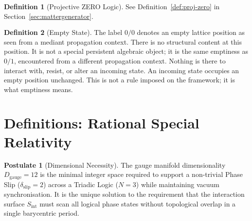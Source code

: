 \documentclass[11pt, letterpaper]{article}
\newcommand{\Dg}{D_{\mathrm{gauge}}}
\newcommand{\Sint}{S_{\mathrm{int}}}
\theoremstyle{definition}
\newtheorem{definition}{Definition}[section]
\newtheorem{postulate}{Postulate}[section]
\theoremstyle{plain}
\begin{document}
\begin{definition}[Projective ZERO Logic]\label{def:proj-zero-logic}
See Definition~\ref{def:proj-zero} in Section~\ref{sec:mattergenerator}.
\end{definition}

\begin{definition}[Empty State]\label{def:null}
The label $0/0$ denotes an empty lattice position as seen from a mediant
propagation context.  There is no structural content at this position.
It is not a special persistent algebraic object; it is the same emptiness
as $0/1$, encountered from a different propagation context.
Nothing is there to interact with, resist, or alter an incoming state.
An incoming state occupies an empty position unchanged.
This is not a rule imposed on the framework; it is what emptiness means.
\end{definition}

\newpage


\section{Definitions: Rational Special Relativity}\label{sec:RSR}

\begin{postulate}[Dimensional Necessity]\label{post:dim-necessity}
The gauge manifold dimensionality $\Dg=12$ is the minimal integer space
required to support a non-trivial Phase Slip ($\delta_{\mathrm{slip}}=2$)
across a Triadic Logic ($N=3$) while maintaining vacuum synchronisation.
It is the unique solution to the requirement that the interaction surface
$\Sint$ must scan all logical phase states without topological overlap in a
single barycentric period.
\end{postulate}
\end{document}
